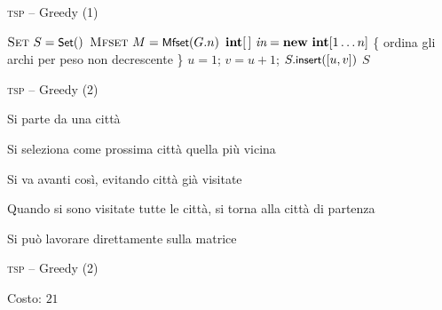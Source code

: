 \begin{frame}[shrink=10]{\textsc{tsp} -- Greedy (1)}

\vspace{-12pt}
\begin{Procedure}
\caption[A]{\Set\ \greedyTsp(\Graph $G$)}
$\textsc{Set}\ S = \textsf{{\small Set}}()$\;
$\textsc{Mfset}\ M = \textsf{{\small Mfset}}(G.n)$\;
$\INTEGER[\,]\ \Inc = \NEW\ \INTEGER[1 \ldots n]$\;
\{ ordina gli archi per peso non decrescente \}\;
\INTEGER $u = 1$;
\INTEGER $v = u+1$; 
$S.\textsf{{\small insert}}([u,v])$\;
\Return $S$\;
\end{Procedure}

\end{frame}



\begin{frame}{\textsc{tsp} -- Greedy (2)}

\vspace{-9pt}
\begin{myboxtitle}
\BIL
\item Si parte da una città
\item Si seleziona come prossima città quella più vicina
\item Si va avanti così, evitando città già visitate
\item Quando si sono visitate tutte le città, si torna alla città di
partenza
\item Si può lavorare direttamente sulla matrice
\EIL
\end{myboxtitle}

\end{frame}

\begin{frame}{\textsc{tsp} -- Greedy (2)}


\alert{
\bigskip
{}Costo: $21$
}


\end{frame}



